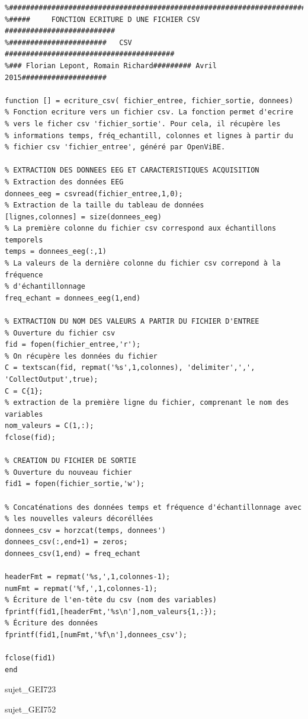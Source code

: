 \begin{verbatim}
%##########################################################################
%#####     FONCTION ECRITURE D UNE FICHIER CSV   ##########################
%#######################   CSV     ########################################
%### Florian Lepont, Romain Richard######### Avril 2015####################

function [] = ecriture_csv( fichier_entree, fichier_sortie, donnees)
% Fonction ecriture vers un fichier csv. La fonction permet d'ecrire
% vers le ficher csv 'fichier_sortie'. Pour cela, il récupère les 
% informations temps, fréq_echantill, colonnes et lignes à partir du
% fichier csv 'fichier_entree', généré par OpenViBE. 

% EXTRACTION DES DONNEES EEG ET CARACTERISTIQUES ACQUISITION
% Extraction des données EEG
donnees_eeg = csvread(fichier_entree,1,0);        
% Extraction de la taille du tableau de données                          
[lignes,colonnes] = size(donnees_eeg)        
% La première colonne du fichier csv correspond aux échantillons temporels                               
temps = donnees_eeg(:,1)           
% La valeurs de la dernière colonne du fichier csv correpond à la fréquence
% d'échantillonnage                                          
freq_echant = donnees_eeg(1,end)                                           

% EXTRACTION DU NOM DES VALEURS A PARTIR DU FICHIER D'ENTREE
% Ouverture du fichier csv 
fid = fopen(fichier_entree,'r');      
% On récupère les données du fichier                                      
C = textscan(fid, repmat('%s',1,colonnes), 'delimiter',',', 'CollectOutput',true); 
C = C{1};
% extraction de la première ligne du fichier, comprenant le nom des variables
nom_valeurs = C(1,:);                                                       
fclose(fid);

% CREATION DU FICHIER DE SORTIE
% Ouverture du nouveau fichier
fid1 = fopen(fichier_sortie,'w');                                           

% Concaténations des données temps et fréquence d'échantillonnage avec 
% les nouvelles valeurs décoréllées
donnees_csv = horzcat(temps, donnees')                                      
donnees_csv(:,end+1) = zeros;
donnees_csv(1,end) = freq_echant

headerFmt = repmat('%s,',1,colonnes-1); 
numFmt = repmat('%f,',1,colonnes-1);
% Écriture de l'en-tête du csv (nom des variables)
fprintf(fid1,[headerFmt,'%s\n'],nom_valeurs{1,:});    
% Écriture des données                      
fprintf(fid1,[numFmt,'%f\n'],donnees_csv');                                 

fclose(fid1)
end
\end{verbatim}


 {sujet_GEI723}

 {sujet_GEI752}

\newpage



%